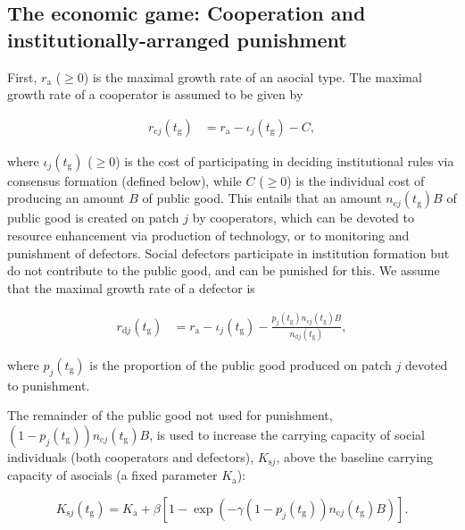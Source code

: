 \documentclass{rstb}
\begin{document}
\begin{linenumbers}
\subsection{The economic game: Cooperation and institutionally-arranged punishment}
First, $r_{\mathrm{a}}$  ($\geq 0$) is the maximal growth rate of an asocial type. The maximal growth rate of a cooperator is assumed to be given by
\begin{linenomath}
\begin{align}
r_{\mathrm{c}j}\left(t_\mathrm{g}\right)&=r_{\mathrm{a}} -\iota_j(t_\mathrm{g}) -C \label{eqnrc},
\end{align}
\end{linenomath}
where $\iota_j(t_\mathrm{g})$ ($\geq 0$) is the cost of participating in deciding institutional rules via consensus formation (defined below), while $C$ ($\geq 0$) is the individual cost of producing an amount $B$ of public good. This entails that an amount $n_{\mathrm{c}j}(t_\mathrm{g})B$ of public good is created on patch $j$ by cooperators, which can be devoted to resource enhancement via production of technology, or to monitoring and punishment of defectors. Social defectors participate in institution formation but do not contribute to the public good, and can be punished for this. We assume that the maximal growth rate of a defector is 
\begin{linenomath}
\begin{align}
r_{\mathrm{d}j}(t_\mathrm{g})&=r_{\mathrm{a}} -\iota_j(t_\mathrm{g})  - \frac{p_j(t_\mathrm{g})n_{\mathrm{c}j}(t_\mathrm{g})B}{n_{\mathrm{d}j}\left(t_\mathrm{g}\right)} \label{eqnrd},
\end{align}
\end{linenomath}
where $p_j(t_\mathrm{g})$ is the proportion of the public good produced on patch $j$ devoted to punishment. 

The remainder of the public good not used for punishment, $(1-p_j(t_\mathrm{g})) n_{\mathrm{c}j}(t_\mathrm{g})B$, is used to increase the carrying capacity of social individuals (both cooperators and defectors), $K_{\mathrm{s}j}$, above the baseline carrying capacity of asocials (a fixed parameter $K_\mathrm{a}$):
\begin{linenomath*}
\begin{equation}
K_{\mathrm{s}j}(t_\mathrm{g}) = K_\mathrm{a} + \beta \left[1-\exp \left(-\gamma (1-p_j(t_\mathrm{g}))n_{\mathrm{c}j}(t_\mathrm{g})B \right) \right]\label{eqnKg}.
\end{equation}
\end{linenomath*}


\end{linenumbers}
\end{document}
